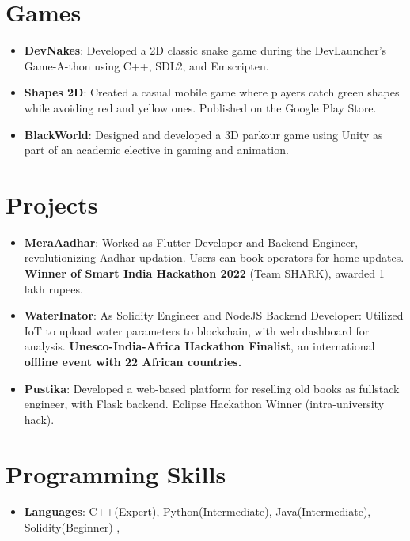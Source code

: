 \documentclass[letterpaper,11pt]{article}
\newcommand{\resumeItem}[2]{
  \item\small{
    \textbf{#1}{: #2 \vspace{-2pt}}
  }
}
\newcommand{\resumeSubItem}[2]{\resumeItem{#1}{#2}\vspace{-4pt}}
\newcommand{\resumeSubHeadingListStart}{\begin{itemize}[leftmargin=*]}
\newcommand{\resumeSubHeadingListEnd}{\end{itemize}}
\begin{document}
\section{Games}
  \resumeSubHeadingListStart
      \resumeSubItem{DevNakes}
      {Developed a 2D classic snake game during the DevLauncher's Game-A-thon using C++, SDL2, and Emscripten.}
      \resumeSubItem{Shapes 2D}
      {Created a casual mobile game where players catch green shapes while avoiding red and yellow ones. Published on the Google Play Store.}
      \resumeSubItem{BlackWorld}
      {Designed and developed a 3D parkour game using Unity as part of an academic elective in gaming and animation.}


  \resumeSubHeadingListEnd


\section{Projects}
  \resumeSubHeadingListStart
      \resumeSubItem{MeraAadhar}
      {Worked as Flutter Developer and Backend Engineer, revolutionizing Aadhar updation. Users can book operators for home updates. \textbf{Winner of Smart India Hackathon 2022} (Team SHARK), awarded 1 lakh rupees.}
      \resumeSubItem{WaterInator}
      {As Solidity Engineer and NodeJS Backend Developer: Utilized IoT to upload water parameters to blockchain, with web dashboard for analysis. \textbf{Unesco-India-Africa Hackathon Finalist}, an international \textbf{offline event with 22 African countries.}}
      \resumeSubItem{Pustika}
      {Developed a web-based platform for reselling old books as fullstack engineer, with Flask backend. Eclipse Hackathon Winner (intra-university hack).}


  \resumeSubHeadingListEnd


\section{Programming Skills}
 \resumeSubHeadingListStart
    \item{
     \textbf{Languages}{: C++(Expert), Python(Intermediate), Java(Intermediate), Solidity(Beginner)}
    },
 \resumeSubHeadingListEnd
\end{document}
